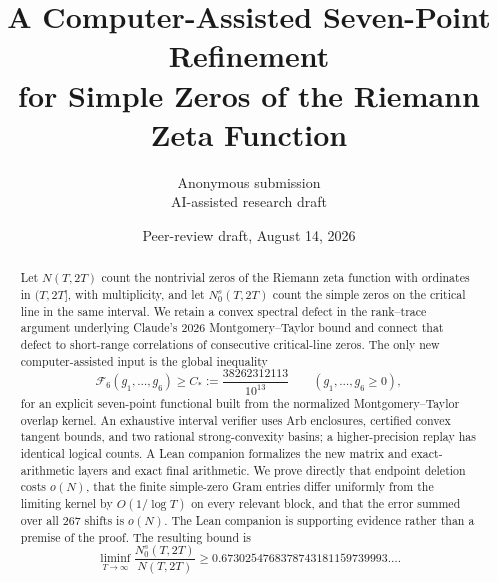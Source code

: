 \documentclass[11pt]{article}
\title{A Computer-Assisted Seven-Point Refinement\\
for Simple Zeros of the Riemann Zeta Function}
\author{Anonymous submission\\\small AI-assisted research draft}
\date{Peer-review draft, August 14, 2026}
\newcommand{\cF}{\mathcal F}
\newcommand{\Nsimple}{N_0^s}
\begin{document}
\maketitle

\begin{center}
\end{center}

\begin{abstract}
Let $N(T,2T)$ count the nontrivial zeros of the Riemann zeta function with
ordinates in $(T,2T]$, with multiplicity, and let $\Nsimple(T,2T)$ count the
simple zeros on the critical line in the same interval.  We retain a convex
spectral defect in the rank--trace argument underlying Claude's 2026
Montgomery--Taylor bound and connect that defect to short-range correlations
of consecutive critical-line zeros.  The only new computer-assisted input is
the global inequality
\[
 \cF_6(g_1,\ldots,g_6)
 \ge C_*:=\frac{38262312113}{10^{13}}
 \qquad(g_1,\ldots,g_6\ge0),
\]
for an explicit seven-point functional built from the normalized
Montgomery--Taylor overlap kernel.  An exhaustive interval verifier uses Arb
enclosures, certified convex tangent bounds, and two rational
strong-convexity basins; a higher-precision replay has identical logical
counts.  A Lean companion formalizes the new matrix and exact-arithmetic
layers and exact final arithmetic.  We prove directly that endpoint deletion
costs $o(N)$, that the finite simple-zero Gram entries differ uniformly from
the limiting kernel by $O(1/\log T)$ on every relevant block, and that the
error summed over all 267 shifts is $o(N)$.  The Lean companion is supporting
evidence rather than a premise of the proof.  The resulting bound is
\[
 \liminf_{T\to\infty}\frac{\Nsimple(T,2T)}{N(T,2T)}
 \ge 0.6730254768378743181159739993\ldots .
\]
\end{abstract}
\end{document}
